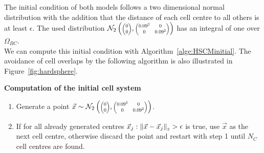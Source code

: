 
The initial condition of both models follows a two dimensional normal distribution with the addition that the distance of each cell centre to all others is at least $\epsilon$.  
The used distribution $\mathcal{N}_2 \left( 
\scalebox{0.7}{$\begin{pmatrix} 0 \\ 0 \end{pmatrix}$}, 
\scalebox{0.7}{$\begin{pmatrix} 0.09^2 & 0 \\ 0 & 0.09^2 \end{pmatrix}$}
\right)$ has an integral of one over $\Omega_{BC}$. \\
We can compute this initial condition with Algorithm~\ref{alge:HSCMinitial}. 
The avoidance of cell overlaps by the following algorithm is also illustrated in Figure~\ref{fig:hardsphere}. 
\begin{algorithm} \textbf{Computation of the initial cell system} \label{alge:HSCMinitial}
	\begin{enumerate} 
		\item Generate a point $\vec{x} \sim \mathcal{N}_2 \left( 
        \scalebox{0.7}{$\begin{pmatrix} 0 \\ 0 \end{pmatrix}$}, 
        \scalebox{0.7}{$\begin{pmatrix} 0.09^2 & 0 \\ 0 & 0.09^2 \end{pmatrix}$}
        \right)$. 
		\item If for all already generated centres $\vec{x}_j: \norm[\vec{x} - \vec{x}_j] > \epsilon$ is true, use $\vec{x}$ as the next cell centre, otherwise discard the point and restart with step 1 until $N_{C}$ cell centres are found. 
	\end{enumerate}	
\end{algorithm}

